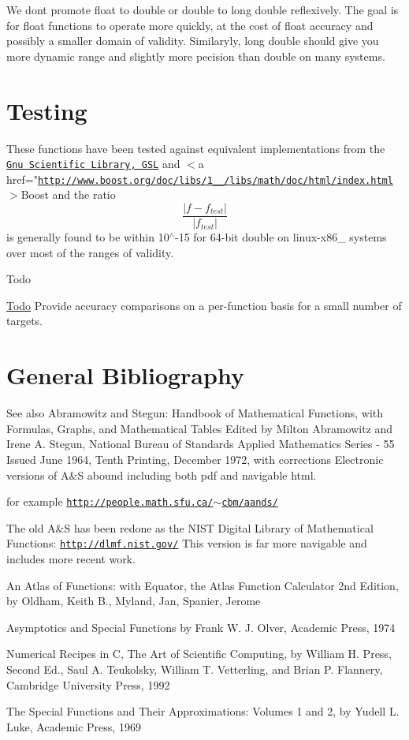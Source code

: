 We don\textquotesingle{}t promote {\ttfamily float} to {\ttfamily double} or {\ttfamily double} to {\ttfamily long double} reflexively. The goal is for {\ttfamily float} functions to operate more quickly, at the cost of {\ttfamily float} accuracy and possibly a smaller domain of validity. Similaryly, {\ttfamily long double} should give you more dynamic range and slightly more pecision than {\ttfamily double} on many systems.\hypertarget{index_testing}{}\section{Testing}\label{index_testing}
These functions have been tested against equivalent implementations from the \href{http://www.gnu.org/software/gsl}{\tt Gnu Scientific Library, G\+S\+L} and $<$a href="\href{http://www.boost.org/doc/libs/1_60_0/libs/math/doc/html/index.html}{\tt http\+://www.\+boost.\+org/doc/libs/1\+\_\+\_/libs/math/doc/html/index.\+html}$>$Boost and the ratio \[ \frac{|f - f_{test}|}{|f_{test}|} \] is generally found to be within 10$^\wedge$-\/15 for 64-\/bit double on linux-\/x86\+\_ systems over most of the ranges of validity.

\begin{DoxyRefDesc}{Todo}
\item[\hyperlink{todo__todo000001}{Todo}]Provide accuracy comparisons on a per-\/function basis for a small number of targets.\end{DoxyRefDesc}
\hypertarget{index_bibliography}{}\section{General Bibliography}\label{index_bibliography}
\begin{DoxySeeAlso}{See also}
Abramowitz and Stegun\+: Handbook of Mathematical Functions, with Formulas, Graphs, and Mathematical Tables Edited by Milton Abramowitz and Irene A. Stegun, National Bureau of Standards Applied Mathematics Series -\/ 55 Issued June 1964, Tenth Printing, December 1972, with corrections Electronic versions of A\&S abound including both pdf and navigable html. 

for example \href{http://people.math.sfu.ca/~cbm/aands/}{\tt http\+://people.\+math.\+sfu.\+ca/$\sim$cbm/aands/}

The old A\&S has been redone as the N\+I\+S\+T Digital Library of Mathematical Functions\+: \href{http://dlmf.nist.gov/}{\tt http\+://dlmf.\+nist.\+gov/} This version is far more navigable and includes more recent work.

An Atlas of Functions\+: with Equator, the Atlas Function Calculator 2nd Edition, by Oldham, Keith B., Myland, Jan, Spanier, Jerome

Asymptotics and Special Functions by Frank W. J. Olver, Academic Press, 1974

Numerical Recipes in C, The Art of Scientific Computing, by William H. Press, Second Ed., Saul A. Teukolsky, William T. Vetterling, and Brian P. Flannery, Cambridge University Press, 1992

The Special Functions and Their Approximations\+: Volumes 1 and 2, by Yudell L. Luke, Academic Press, 1969 
\end{DoxySeeAlso}
